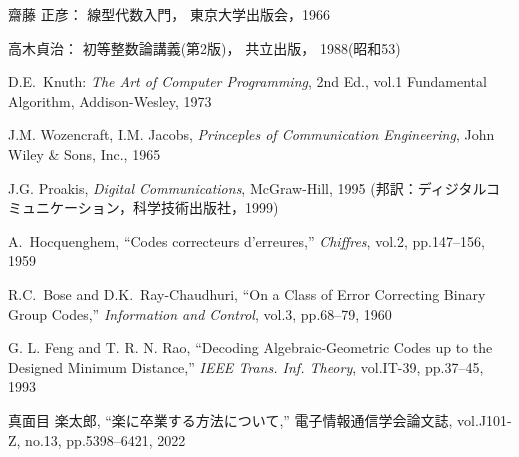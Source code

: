 \begin{thebibliography}{9}%
齋藤 正彦：
線型代数入門，
東京大学出版会，1966

高木貞治：
初等整数論講義(第2版)，
共立出版，
1988(昭和53)

D.E.~Knuth:
{\it The Art of Computer Programming},
2nd Ed.,
vol.1 Fundamental Algorithm,
Addison-Wesley,
1973

J.M. Wozencraft, 
I.M. Jacobs,
{\it Princeples of Communication Engineering},
John Wiley \& Sons, Inc., 1965

J.G. Proakis, 
{\it Digital Communications},
McGraw-Hill, 1995
(邦訳：ディジタルコミュニケーション，科学技術出版社，1999)


A.~Hocquenghem,
``Codes correcteurs d'erreures,''
{\it Chiffres}, vol.2, pp.147--156, 1959

R.C.~Bose and D.K.~Ray-Chaudhuri,
``On a Class of Error Correcting Binary Group Codes,''
{\it Information and Control}, vol.3, pp.68--79, 1960

G. L. Feng and T. R. N. Rao,
``Decoding Algebraic-Geometric Codes
up to the Designed Minimum Distance,''
{\it IEEE Trans. Inf. Theory},
vol.IT-39, pp.37--45, 1993

真面目 楽太郎,
``楽に卒業する方法について,''
電子情報通信学会論文誌,
vol.J101-Z, no.13, pp.5398--6421, 2022

\end{thebibliography}
